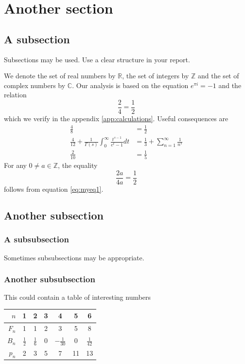 \documentclass{uonmathreport}
\newcommand{\ZZ}{\mathbb{Z}}
\begin{document}
\section{Another section} \label{sec:my1}

\subsection{A subsection} \label{subsec:theory}

Subsections may be used. Use a clear structure in your report.

We denote the set of real numbers by
$\mathbb{R}$, the set of integers by $\ZZ$ and the set of complex
numbers by $\mathbb{C}$. Our analysis is based on the equation
$e^{\pi i} = -1$ and the relation
\begin{equation}
  \frac{2}{4} = \frac{1}{2}   \label{eq:myeq1}
\end{equation} %
which we verify in the appendix \ref{app:calculations}.
Useful consequences are
\begin{align}
  \frac{4}{8} &= \frac{1}{2} \\
  \frac{4}{12} + \frac{1}{\Gamma(s)}\int_0^{\infty} \frac{t^{s-1}}{e^t-1} dt
     &= \frac{1}{3} +\sum_{n=1}^{\infty} \frac{1}{n^s}\\
  \frac{2}{10} &= \frac{1}{5} 
\end{align}
For any $0\neq a\in \ZZ$, the equality
\begin{equation*} %
 \frac{2 a}{4 a} = \frac{1}{2}
\end{equation*}
follows from equation \eqref{eq:myeq1}.

\subsection{Another subsection} \label{subsec:application}

\subsubsection{A subsubsection} \label{subsubsec:red}

Sometimes subsubsections may be appropriate.

\subsubsection{Another subsubsection} \label{subsubsec:green}

This could contain a table of interesting numbers
\begin{center}
  \begin{tabular}{r|cccccc}
    $n$   & 1 & 2 & 3 & 4 & 5 & 6 \\ \hline
    $F_n$ & 1 & 1 & 2 & 3 & 5 & 8 \\
    $B_n$ & $\tfrac{1}{2}$ & $\tfrac{1}{6}$ & 0 & $-\tfrac{1}{30}$ & 0 &  $\tfrac{1}{42}$ \\
    $p_n$ & 2 & 3& 5& 7 & 11 & 13 \\
  \end{tabular}
\end{center}
\end{document}
